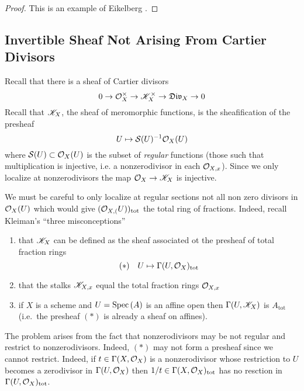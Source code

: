 \documentclass[12pt]{article}
\begin{document}
\begin{proof}
This is an example of Eikelberg . 
\end{proof}

\subsection{Invertible Sheaf Not Arising From Cartier Divisors}

\renewcommand{\Div}{\mathfrak{Div}}
\newcommand{\tot}{\mathrm{tot}}

Recall that there is a sheaf of Cartier divisors
\[ 0 \to \struct{X}^\times \to \K_X^\times \to \Div_X \to 0 \]
Recall that $\mathscr{K}_X$, the sheaf of meromorphic functions, is the sheafification of the presheaf
\[ U \mapsto \mathcal{S}(U)^{-1} \mathcal{O}_{X}(U) \]
where $\mathcal{S}(U) \subset \mathcal{O}_{X}(U)$ is the subset of \textit{regular} functions (those such that multiplication is injective, i.e. a nonzerodivisor in each $\mathcal{O}_{X, x}$). Since we only localize at nonzerodivisors the map $\mathcal{O}_{X} \to \mathscr{K}_X$ is injective. 
\par 
We must be careful to only localize at regular sections not all non zero divisors in $\mathcal{O}_{X}(U)$ which would give $(\stalk{X}(U))_{\tot}$ the total ring of fractions. Indeed, recall Kleiman's ``three misconceptions''
\begin{enumerate}
\item that $\mathscr{K}_X$ can be defined as the sheaf associated ot the presheaf of total fraction rings
\[ (\ast) \quad U \mapsto \Gamma(U, \struct{X})_{\tot} \]
\item that the stalks $\mathscr{K}_{X,x}$ equal the total fraction rings $\mathcal{O}_{X, x}$
\item if $X$ is a scheme and $U = \mathrm{Spec}\left( A \right)$ is an affine open then $\Gamma(U, \mathscr{K}_X)$ is $A_{\tot}$ (i.e.\ the presheaf $(\ast)$ is already a sheaf on affines).
\end{enumerate}
The problem arises from the fact that nonzerodivisors may be not regular and restrict to nonzerodivisors. Indeed, $(\ast)$ may not form a presheaf since we cannot restrict. Indeed, if $t \in \Gamma(X, \mathcal{O}_{X})$ is a nonzerodivisor whose restriction to $U$ becomes a zerodivisor in $\Gamma(U, \mathcal{O}_{X})$ then $1/t \in \Gamma(X, \struct{X})_{\tot}$ has no resction in $\Gamma(U, \struct{X})_{\tot}$. 
\end{document}
